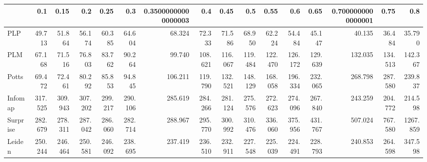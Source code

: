 \begin{tabular}{lrrrrrrrrrrrrrrr}
\toprule
{} &     0.1 &    0.15 &     0.2 &    0.25 &     0.3 & 0.35000000000000003 &     0.4 &    0.45 &     0.5 &    0.55 &     0.6 &    0.65 & 0.7000000000000001 &    0.75 &      0.8 \\
\midrule
PLP      &  49.713 &  51.864 &  56.174 &  60.385 &  64.604 &              68.324 &  72.333 &  71.586 &  68.950 &  62.224 &  54.484 &  45.147 &             40.135 &  36.484 &   35.790 \\
PLM      &  67.168 &  71.516 &  76.803 &  83.762 &  90.264 &              99.740 & 108.621 & 116.067 & 119.484 & 122.470 & 126.172 & 129.639 &            132.035 & 134.513 &  142.367 \\
Potts    &  69.472 &  72.461 &  80.292 &  85.853 &  94.845 &             106.211 & 119.790 & 132.521 & 148.129 & 168.058 & 196.334 & 232.065 &            268.798 & 287.580 &  239.837 \\
Infomap  & 317.525 & 309.943 & 307.202 & 299.217 & 290.106 &             285.619 & 284.266 & 281.124 & 275.576 & 272.623 & 274.096 & 267.840 &            243.259 & 204.772 &  214.598 \\
Surprise & 282.679 & 278.311 & 287.042 & 286.060 & 282.714 &             288.967 & 295.770 & 300.992 & 310.476 & 336.060 & 375.956 & 431.767 &            507.024 & 767.580 & 1267.859 \\
Leiden   & 250.244 & 246.464 & 250.581 & 246.092 & 238.695 &             237.419 & 236.510 & 232.911 & 227.548 & 225.039 & 224.491 & 228.793 &            240.853 & 264.598 &  347.598 \\
\bottomrule
\end{tabular}
